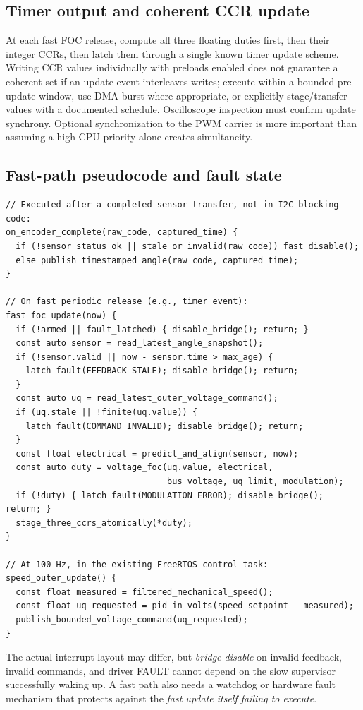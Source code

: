 \documentclass[10pt,letterpaper]{article}
\begin{document}
\subsection{Timer output and coherent CCR update}
At each fast FOC release, compute all three floating duties first, then their integer CCRs, then latch them through a single known timer update scheme. Writing CCR values individually with preloads enabled does not guarantee a coherent set if an update event interleaves writes; execute within a bounded pre-update window, use DMA burst where appropriate, or explicitly stage/transfer values with a documented schedule. Oscilloscope inspection must confirm update synchrony. Optional synchronization to the PWM carrier is more important than assuming a high CPU priority alone creates simultaneity.

\subsection{Fast-path pseudocode and fault state}
\begin{lstlisting}[caption={Conceptual ISR/task split; schematic only}]
// Executed after a completed sensor transfer, not in I2C blocking code:
on_encoder_complete(raw_code, captured_time) {
  if (!sensor_status_ok || stale_or_invalid(raw_code)) fast_disable();
  else publish_timestamped_angle(raw_code, captured_time);
}

// On fast periodic release (e.g., timer event):
fast_foc_update(now) {
  if (!armed || fault_latched) { disable_bridge(); return; }
  const auto sensor = read_latest_angle_snapshot();
  if (!sensor.valid || now - sensor.time > max_age) {
    latch_fault(FEEDBACK_STALE); disable_bridge(); return;
  }
  const auto uq = read_latest_outer_voltage_command();
  if (uq.stale || !finite(uq.value)) {
    latch_fault(COMMAND_INVALID); disable_bridge(); return;
  }
  const float electrical = predict_and_align(sensor, now);
  const auto duty = voltage_foc(uq.value, electrical,
                                bus_voltage, uq_limit, modulation);
  if (!duty) { latch_fault(MODULATION_ERROR); disable_bridge(); return; }
  stage_three_ccrs_atomically(*duty);
}

// At 100 Hz, in the existing FreeRTOS control task:
speed_outer_update() {
  const float measured = filtered_mechanical_speed();
  const float uq_requested = pid_in_volts(speed_setpoint - measured);
  publish_bounded_voltage_command(uq_requested);
}
\end{lstlisting}
The actual interrupt layout may differ, but \emph{bridge disable} on invalid feedback, invalid commands, and driver FAULT cannot depend on the slow supervisor successfully waking up. A fast path also needs a watchdog or hardware fault mechanism that protects against the \emph{fast update itself failing to execute}.
\end{document}
